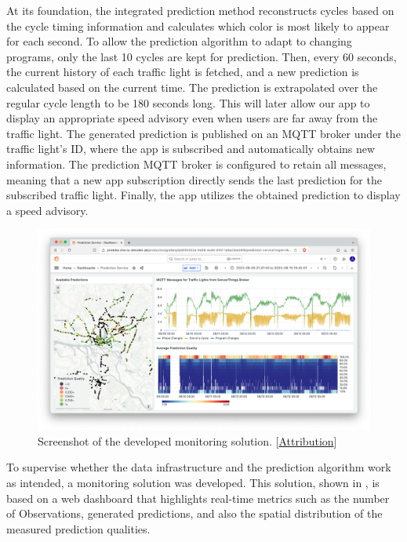 At its foundation, the integrated prediction method reconstructs cycles based on the cycle timing information and calculates which color is most likely to appear for each second. To allow the prediction algorithm to adapt to changing programs, only the last 10 cycles are kept for prediction. Then, every 60 seconds, the current history of each traffic light is fetched, and a new prediction is calculated based on the current time. The prediction is extrapolated over the regular cycle length to be 180 seconds long. This will later allow our app to display an appropriate speed advisory even when users are far away from the traffic light. The generated prediction is published on an MQTT broker under the traffic light's ID, where the app is subscribed and automatically obtains new information. The prediction MQTT broker is configured to retain all messages, meaning that a new app subscription directly sends the last prediction for the subscribed traffic light. Finally, the app utilizes the obtained prediction to display a speed advisory.

\begin{figure}[t]
\centering
\includegraphics[width=\linewidth]{images/monitoring-screenshot.png}
\caption{Screenshot of the developed monitoring solution. [\hyperref[attribution]{Attribution}]}
\label{fig:monitoring-screenshot}
\end{figure}

To supervise whether the data infrastructure and the prediction algorithm work as intended, a monitoring solution was developed. This solution, shown in , is based on a web dashboard that highlights real-time metrics such as the number of Observations, generated predictions, and also the spatial distribution of the measured prediction qualities. 

